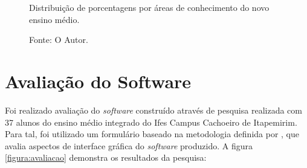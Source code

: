 \begin{figure}[H]
    \caption{Distribuição de porcentagens por áreas de conhecimento do novo ensino médio.}
	\centering %
	\label{figura:distribuicao}
	\captionsetup{singlelinecheck = false, format= hang, justification=raggedright, labelsep=space, width=6.5cm}
	\caption*{\footnotesize Fonte: O Autor.}
\end{figure}

\section{Avaliação do Software}

Foi realizado avaliação do \textit{software} construído através de pesquisa realizada com 37 alunos do ensino médio integrado do Ifes Campus Cachoeiro de Itapemirim. Para tal, foi utilizado um formulário baseado na metodologia definida por , que avalia aspectos de interface gráfica do \textit{software} produzido. A figura \ref{figura:avaliacao} demonstra os resultados da pesquisa:

